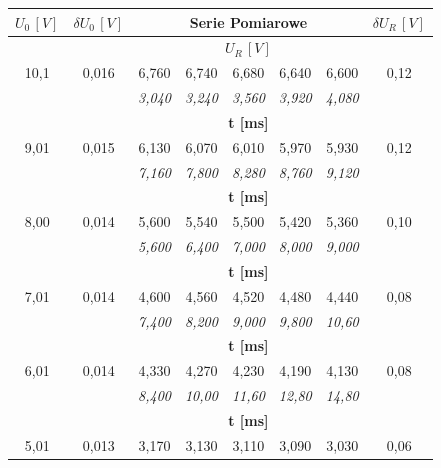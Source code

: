 \documentclass[12pt]{article}
\begin{document}
\begin{table}[H]
    \centering
    \begin{tabular}{c|c|ccccc|c}
        \toprule
        $U_0 \,[V]$ & $\delta U_0 \,[V]$ & \multicolumn{5}{c}{Serie Pomiarowe} & $\delta U_R \,[V]$ \\
        \midrule
        & & \multicolumn{5}{c}{$U_R \,[V]$} & \\
        10{,}1  & 0{,}016 & 6{,}760  & 6{,}740  & 6{,}680  & 6{,}640  & 6{,}600 & 0{,}12 \\
                &         & \textit{3{,}040}  & \textit{3{,}240}  & \textit{3{,}560}  & \textit{3{,}920}  & \textit{4{,}080} &   \\
                &         & \multicolumn{5}{c}{\textbf{t [ms]}} & \\[6pt]
        \midrule
        9{,}01  & 0{,}015 & 6{,}130  & 6{,}070  & 6{,}010  & 5{,}970  & 5{,}930 & 0{,}12 \\
                &         & \textit{7{,}160}  & \textit{7{,}800}  & \textit{8{,}280}  & \textit{8{,}760}  & \textit{9{,}120} & \\
                &         & \multicolumn{5}{c}{\textbf{t [ms]}} & \\[6pt]
        \midrule
        8{,}00  & 0{,}014 & 5{,}600  & 5{,}540  & 5{,}500  & 5{,}420  & 5{,}360 & 0{,}10 \\
                &         & \textit{5{,}600}  & \textit{6{,}400}  & \textit{7{,}000}  & \textit{8{,}000}  & \textit{9{,}000} & \\
                &         & \multicolumn{5}{c}{\textbf{t [ms]}} & \\[6pt]
        \midrule
        7{,}01  & 0{,}014 & 4{,}600  & 4{,}560  & 4{,}520  & 4{,}480  & 4{,}440 & 0{,}08 \\
                &         & \textit{7{,}400}  & \textit{8{,}200}  & \textit{9{,}000}  & \textit{9{,}800}  & \textit{10{,}60} & \\
                &         & \multicolumn{5}{c}{\textbf{t [ms]}} & \\[6pt]
        \midrule
        6{,}01  & 0{,}014 & 4{,}330  & 4{,}270  & 4{,}230  & 4{,}190  & 4{,}130 & 0{,}08 \\
                &         & \textit{8{,}400}  & \textit{10{,}00}  & \textit{11{,}60}  & \textit{12{,}80}  & \textit{14{,}80} & \\
                &         & \multicolumn{5}{c}{\textbf{t [ms]}} & \\[6pt]
        \midrule
        5{,}01  & 0{,}013 & 3{,}170  & 3{,}130  & 3{,}110  & 3{,}090  & 3{,}030 & 0{,}06 \\

\end{tabular}
\end{table}
\end{document}
